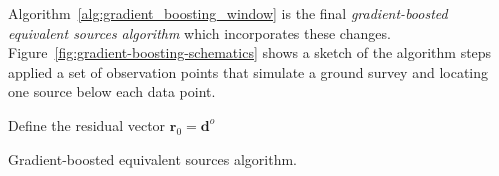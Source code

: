 Algorithm~\ref{alg:gradient_boosting_window} is the final
\textit{gradient-boosted equivalent sources algorithm} which incorporates these
changes.
Figure~\ref{fig:gradient-boosting-schematics} shows a sketch of the algorithm
steps applied a set of observation points that simulate a ground survey and
locating one source below each data point.

\begin{algorithm}[!h]
  \DontPrintSemicolon
  Define the residual vector $\mathbf{r}_{0} = \mathbf{d}^o$ \;
  \BlankLine
  \caption{Gradient-boosted equivalent sources algorithm.}
  \label{alg:gradient_boosting_window}
\end{algorithm}

